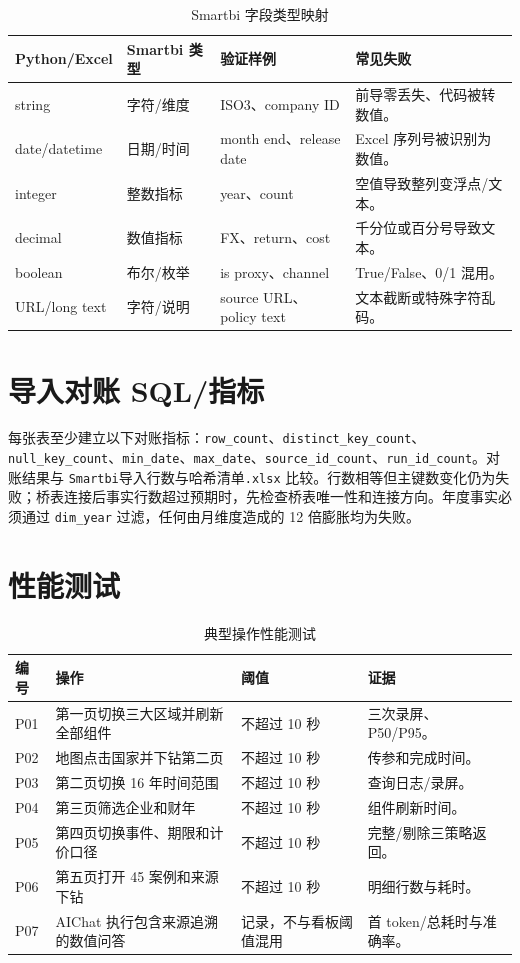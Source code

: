 \documentclass[UTF8,fontset=windows,12pt,openany]{ctexbook}
\newcommand{\Field}[1]{{\small\nolinkurl{#1}}}
\newcommand{\File}[1]{{\small\nolinkurl{#1}}}
\begin{document}
\begin{longtable}{p{3.3cm}p{3.6cm}p{3.2cm}p{3.7cm}}
\caption{Smartbi 字段类型映射}\label{tab:smartbi-types}\\
\toprule
\textbf{Python/Excel} & \textbf{Smartbi 类型} & \textbf{验证样例} & \textbf{常见失败}\\
\midrule
string & 字符/维度 & ISO3、company ID & 前导零丢失、代码被转数值。\\
date/datetime & 日期/时间 & month end、release date & Excel 序列号被识别为数值。\\
integer & 整数指标 & year、count & 空值导致整列变浮点/文本。\\
decimal & 数值指标 & FX、return、cost & 千分位或百分号导致文本。\\
boolean & 布尔/枚举 & is proxy、channel & True/False、0/1 混用。\\
URL/long text & 字符/说明 & source URL、policy text & 文本截断或特殊字符乱码。\\
\bottomrule
\end{longtable}

\section{导入对账 SQL/指标}

每张表至少建立以下对账指标：\Field{row_count}、\Field{distinct_key_count}、\Field{null_key_count}、\Field{min_date}、\Field{max_date}、\Field{source_id_count}、\Field{run_id_count}。对账结果与 \File{Smartbi}\textsf{导入行数与哈希清单}\File{.xlsx} 比较。行数相等但主键数变化仍为失败；桥表连接后事实行数超过预期时，先检查桥表唯一性和连接方向。年度事实必须通过 \Field{dim_year} 过滤，任何由月维度造成的 12 倍膨胀均为失败。

\section{性能测试}

\begin{longtable}{p{2.0cm}p{4.7cm}p{3.1cm}p{3.8cm}}
\caption{典型操作性能测试}\label{tab:performance}\\
\toprule
\textbf{编号} & \textbf{操作} & \textbf{阈值} & \textbf{证据}\\
\midrule
P01 & 第一页切换三大区域并刷新全部组件 & 不超过 10 秒 & 三次录屏、P50/P95。\\
P02 & 地图点击国家并下钻第二页 & 不超过 10 秒 & 传参和完成时间。\\
P03 & 第二页切换 16 年时间范围 & 不超过 10 秒 & 查询日志/录屏。\\
P04 & 第三页筛选企业和财年 & 不超过 10 秒 & 组件刷新时间。\\
P05 & 第四页切换事件、期限和计价口径 & 不超过 10 秒 & 完整/剔除三策略返回。\\
P06 & 第五页打开 45 案例和来源下钻 & 不超过 10 秒 & 明细行数与耗时。\\
P07 & AIChat 执行包含来源追溯的数值问答 & 记录，不与看板阈值混用 & 首 token/总耗时与准确率。\\
\bottomrule
\end{longtable}
\end{document}
